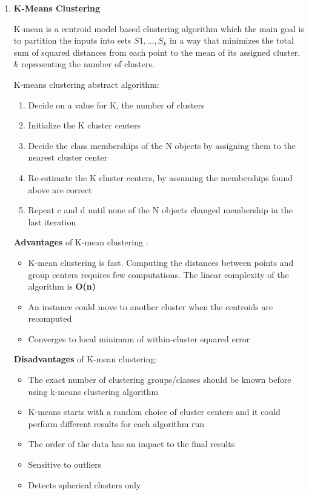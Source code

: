 \begin{enumerate} 

    \item \textbf{K-Means Clustering}
    
    K-mean is a centroid model based clustering algorithm which the main goal is to partition the inputs into sets $S1,...,S_{k}$ in a way that minimizes the total sum of squared distances from each point to the mean of its assigned cluster. $k$ representing the number of clusters. 
    
    K-means \cite{BIB8} clustering abstract algorithm:
    
    \begin{enumerate}
        \item Decide on a value for K, the number of clusters
        \item Initialize the K cluster centers 
        \item Decide the class memberships of the N objects by assigning them to the nearest cluster center
        \item Re-estimate the K cluster centers, by assuming the memberships found above are correct
        \item Repeat c and d until none of the N objects changed membership in the last iteration
    \end{enumerate}
    
    \textbf{Advantages} of K-mean clustering :
    \begin{itemize}
        \item K-mean clustering is fast. Computing the distances between points and group centers requires few computations. The linear complexity of the algorithm is \textbf{O(n)}
        \item An instance could move to another cluster when the centroids are recomputed
        \item Converges to local minimum of within-cluster squared error
    \end{itemize}
    
    
    \textbf{Disadvantages} of K-mean clustering:
    \begin{itemize}
        \item The exact number of clustering groups/classes should be known before using k-means clustering algorithm 
        \item K-means starts with a random choice of cluster centers and it could perform different results for each algorithm run
        \item The order of the data has an impact to the final results
        \item Sensitive to outliers
        \item Detects spherical clusters only
    \end{itemize}
    

\end{enumerate}
